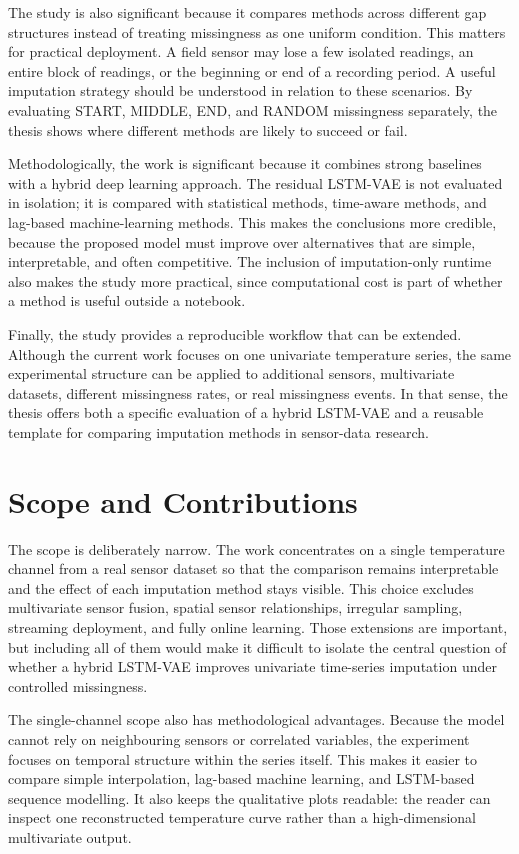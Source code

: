 The study is also significant because it compares methods across different gap structures instead of treating missingness as one uniform condition. This matters for practical deployment. A field sensor may lose a few isolated readings, an entire block of readings, or the beginning or end of a recording period. A useful imputation strategy should be understood in relation to these scenarios. By evaluating START, MIDDLE, END, and RANDOM missingness separately, the thesis shows where different methods are likely to succeed or fail.

Methodologically, the work is significant because it combines strong baselines with a hybrid deep learning approach. The residual LSTM-VAE is not evaluated in isolation; it is compared with statistical methods, time-aware methods, and lag-based machine-learning methods. This makes the conclusions more credible, because the proposed model must improve over alternatives that are simple, interpretable, and often competitive. The inclusion of imputation-only runtime also makes the study more practical, since computational cost is part of whether a method is useful outside a notebook.

Finally, the study provides a reproducible workflow that can be extended. Although the current work focuses on one univariate temperature series, the same experimental structure can be applied to additional sensors, multivariate datasets, different missingness rates, or real missingness events. In that sense, the thesis offers both a specific evaluation of a hybrid LSTM-VAE and a reusable template for comparing imputation methods in sensor-data research.

\section{Scope and Contributions}
The scope is deliberately narrow. The work concentrates on a single temperature channel from a real sensor dataset so that the comparison remains interpretable and the effect of each imputation method stays visible. This choice excludes multivariate sensor fusion, spatial sensor relationships, irregular sampling, streaming deployment, and fully online learning. Those extensions are important, but including all of them would make it difficult to isolate the central question of whether a hybrid LSTM-VAE improves univariate time-series imputation under controlled missingness.

The single-channel scope also has methodological advantages. Because the model cannot rely on neighbouring sensors or correlated variables, the experiment focuses on temporal structure within the series itself. This makes it easier to compare simple interpolation, lag-based machine learning, and LSTM-based sequence modelling. It also keeps the qualitative plots readable: the reader can inspect one reconstructed temperature curve rather than a high-dimensional multivariate output.

